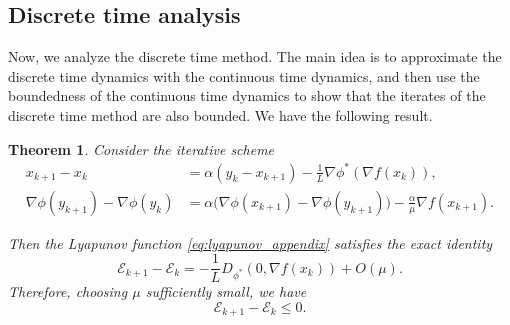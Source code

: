 \documentclass{article}
\theoremstyle{plain}
\newtheorem{theorem}{Theorem}[section]
\theoremstyle{definition}
\theoremstyle{remark}
\begin{document}
\subsection{Discrete time analysis}
Now, we analyze the discrete time method. The main idea is to approximate the discrete time dynamics with the continuous time dynamics, and then use the boundedness of the continuous time dynamics to show that the iterates of the discrete time method are also bounded. We have the following result.
\begin{theorem}
Consider the iterative scheme
\begin{align*}
x_{k+1}-x_k
&=
\alpha (y_k-x_{k+1})
-\frac{1}{L}\nabla\phi^*(\nabla f(x_k)),\\[6pt]
\nabla\phi(y_{k+1})-\nabla\phi(y_k)
&=
\alpha\big(\nabla\phi(x_{k+1})-\nabla\phi(y_{k+1})\big)
-\frac{\alpha}{\mu}\nabla f(x_{k+1}).
\end{align*}

Then the Lyapunov function \eqref{eq:lyapunov_appendix} satisfies the exact identity
\[
\mathcal{E}_{k+1}-\mathcal{E}_k
=
-\frac{1}{L}D_{\phi^*}(0,\nabla f(x_k))+O(\mu).
\]
Therefore, choosing $\mu$ sufficiently small, we have
\[
\mathcal{E}_{k+1}-\mathcal{E}_k
\le
0.
\]
\end{theorem}
\end{document}
